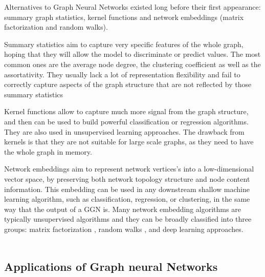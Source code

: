 Alternatives to Graph Neural Networks existed long before their first appearance: summary graph statistics, kernel functions and network embeddings (matrix factorization and random walks).

Summary statistics aim to capture very specific features of the whole graph, hoping that they will allow the model to discriminate or predict values. The most common ones are the average node degree, the clustering coefficient as well as the assortativity. They usually lack a lot of representation flexibility and fail to correctly capture aspects of the graph structure that are not reflected by those summary statistics


Kernel functions allow to capture much more signal from the graph structure, and then can be used to build powerful classification or regression algorithms. They are also used in unsupervised learning approaches. The drawback from kernels is that they are not suitable for large scale graphs, as they need to have the whole graph in memory.

 
Network embeddings aim to represent network vertices's into a low-dimensional vector space, by preserving both network topology structure and node content information. This embedding can be used in any downstream shallow machine learning algorithm, such as classification, regression, or clustering, in the same way that the output of a GGN is. Many network embedding algorithms are typically unsupervised algorithms and they can be broadly classified into three groups: matrix factorization \cite{38}, random walks \cite{40}, and deep learning approaches.\\
\\











\subsection{Applications of Graph neural Networks}


